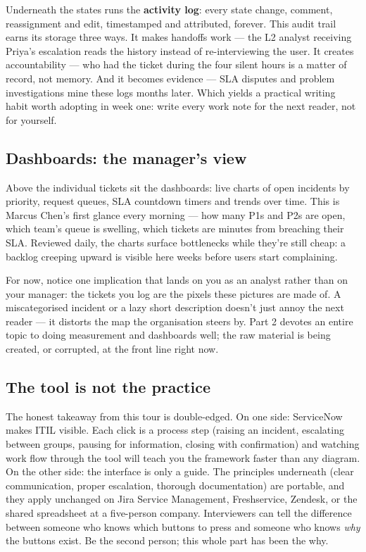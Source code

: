Underneath the states runs the \textbf{activity log}: every state change, comment, reassignment and edit, timestamped and attributed, forever. This audit trail earns its storage three ways. It makes handoffs work — the L2 analyst receiving Priya's escalation reads the history instead of re-interviewing the user. It creates accountability — who had the ticket during the four silent hours is a matter of record, not memory. And it becomes evidence — SLA disputes and problem investigations mine these logs months later. Which yields a practical writing habit worth adopting in week one: write every work note for the next reader, not for yourself.



\subsection{Dashboards: the manager's view}


Above the individual tickets sit the dashboards: live charts of open incidents by priority, request queues, SLA countdown timers and trends over time. This is Marcus Chen's first glance every morning — how many P1s and P2s are open, which team's queue is swelling, which tickets are minutes from breaching their SLA. Reviewed daily, the charts surface bottlenecks while they're still cheap: a backlog creeping upward is visible here weeks before users start complaining.


For now, notice one implication that lands on you as an analyst rather than on your manager: the tickets you log are the pixels these pictures are made of. A miscategorised incident or a lazy short description doesn't just annoy the next reader — it distorts the map the organisation steers by. Part 2 devotes an entire topic to doing measurement and dashboards well; the raw material is being created, or corrupted, at the front line right now.



\subsection{The tool is not the practice}


The honest takeaway from this tour is double-edged. On one side: ServiceNow makes ITIL visible. Each click is a process step (raising an incident, escalating between groups, pausing for information, closing with confirmation) and watching work flow through the tool will teach you the framework faster than any diagram. On the other side: the interface is only a guide. The principles underneath (clear communication, proper escalation, thorough documentation) are portable, and they apply unchanged on Jira Service Management, Freshservice, Zendesk, or the shared spreadsheet at a five-person company. Interviewers can tell the difference between someone who knows which buttons to press and someone who knows \emph{why} the buttons exist. Be the second person; this whole part has been the why.



